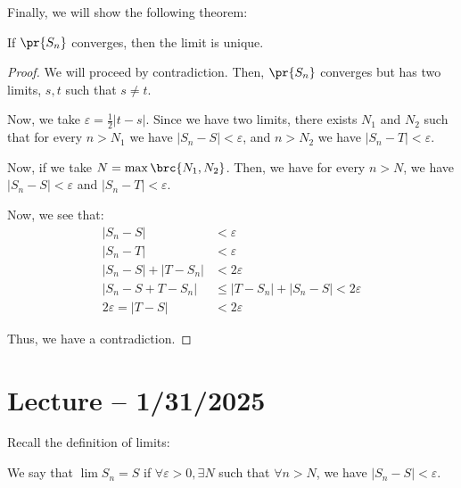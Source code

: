 \documentclass[openany]{book}
\begin{document}
Finally, we will show the following theorem:
\begin{thm}
	If $\pr{S_n}$ converges, then the limit is unique.
\end{thm}
\begin{proof}
	We will proceed by contradiction. Then, $\pr{S_n}$ converges but has two limits, $s, t$ such that $s \neq t$.
	
	Now, we take $\varepsilon = \frac{1}{2}\lvert t - s \rvert$. Since we have two limits, there exists $N_1$ and $N_2$ such that for every $n > N_1$ we have $\lvert S_n - S \rvert < \varepsilon$, and $n > N_2$ we have $\lvert S_n - T \rvert < \varepsilon$.
	
	Now, if we take $N = \max\brc{N_1, N_2}$. Then, we have for every $n > N$, we have $\lvert S_n - S \rvert < \varepsilon$ and $\lvert S_n - T \rvert < \varepsilon$.
	
	Now, we see that:
	\begin{align*}
		\lvert S_n - S \rvert &< \varepsilon \\
		\lvert S_n - T \rvert &< \varepsilon \\
		\lvert S_n - S \rvert + \lvert T - S_n \rvert &< 2\varepsilon \\
		\lvert S_n - S + T - S_n \rvert &\leq \lvert T - S_n \rvert + \lvert S_n - S \rvert < 2\varepsilon \\
		2\varepsilon = \lvert T-S \rvert &< 2\varepsilon 
	\end{align*}
	
	Thus, we have a contradiction.
\end{proof}

\section{Lecture -- 1/31/2025}
Recall the definition of limits:
\begin{defn}
	We say that $\lim S_n = S$ if $\forall \varepsilon > 0, \exists N$ such that $\forall n > N$, we have $\lvert S_n - S \rvert < \varepsilon$.
\end{defn}
\end{document}
